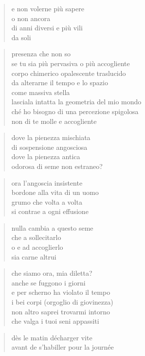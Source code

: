 	\begin{verse}
		e non volerne più sapere\\
		o non ancora\\
		di anni diversi e più vili\\
		da soli
	\end{verse}

\clearpage


	\begin{verse}
		presenza che non so\\
		se tu sia più pervasiva o più accogliente\\
		corpo chimerico opalescente traslucido\\
		da alterarne il tempo e lo spazio\\
		come massiva stella\\
		lasciala intatta la geometria del mio mondo\\
		ché ho bisogno di una percezione spigolosa\\
		non di te molle e accogliente
	\end{verse}

\clearpage


	\begin{verse}
		dove la pienezza mischiata\\
		di sospensione angosciosa\\
		dove la pienezza antica\\
		odorosa di seme non estraneo?
	\end{verse}

	\begin{verse}
		ora l’angoscia insistente\\
		bordone alla vita di un uomo\\
		grumo che volta a volta\\
		si contrae a ogni effusione
	\end{verse}

	\begin{verse}
		nulla cambia a questo seme\\
		che a sollecitarlo\\
		o e ad accoglierlo\\
		sia carne altrui
	\end{verse}

\clearpage


	\begin{verse}
		che siamo ora, mia diletta?\\
		anche se fuggono i giorni\\
		e per scherno ha violato il tempo\\
		i bei corpi (orgoglio di giovinezza)\\
		non altro saprei trovarmi intorno\\
		che valga i tuoi seni appassiti
	\end{verse}

\clearpage


	\begin{verse}
		dès le matin décharger vite\\
		avant de s'habiller pour la journée
	\end{verse}
